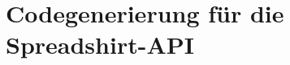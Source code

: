 \chapter{Codegenerierung für die Spreadshirt-API}
\label{chap:generation_for_spreadshirt-api}






